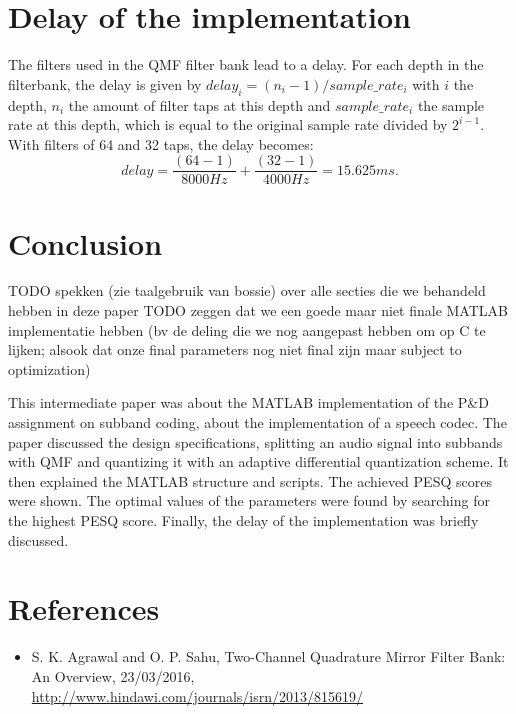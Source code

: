 \documentclass[a4paper]{article}
\begin{document}
\section{Delay of the implementation}
The filters used in the QMF filter bank lead to a delay. For each depth in the filterbank, the delay is given by $delay_i = (n_i-1) / sample\_rate_i$ with $i$ the depth, $n_i$ the amount of filter taps at this depth and $sample\_rate_i$ the sample rate at this depth, which is equal to the original sample rate divided by $2^{i-1}$. With filters of 64 and 32 taps, the delay becomes:
\begin{equation*}
delay = \frac{(64-1)}{8000 Hz} + \frac{(32-1)}{4000 Hz} = 15.625 ms.
\end{equation*}

\section{Conclusion}
TODO spekken (zie taalgebruik van bossie) over alle secties die we behandeld hebben in deze paper
TODO zeggen dat we een goede maar niet finale MATLAB implementatie hebben (bv de deling die we nog aangepast hebben om op C te lijken; alsook dat onze final parameters nog niet final zijn maar subject to optimization)

This intermediate paper was about the MATLAB implementation of the P\&D assignment on subband coding, about the implementation of a speech codec. The paper discussed the design specifications, splitting an audio signal into subbands with QMF and quantizing it with an adaptive differential quantization scheme. It then explained the MATLAB structure and scripts. The achieved PESQ scores were shown. The optimal values of the parameters were found by searching for the highest PESQ score. Finally, the delay of the implementation was briefly discussed.

\section{References}
\begin{itemize}
\item S. K. Agrawal and O. P. Sahu, Two-Channel Quadrature Mirror Filter Bank: An Overview, 23/03/2016, \url{http://www.hindawi.com/journals/isrn/2013/815619/}
\end{itemize}
\end{document}
